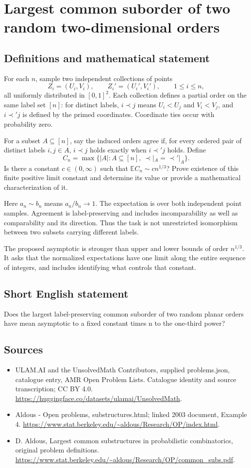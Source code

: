 \documentclass[11pt,a4paper]{article}
\begin{document}
\section*{Largest common suborder of two random two-dimensional orders}\label{statement}

\subsection{Definitions and mathematical statement}
For each $n$, sample two independent collections of points
\[
Z_i=(U_i,V_i),\qquad Z_i'=(U_i',V_i'),\qquad 1\le i\le n,
\]
all uniformly distributed in $[0,1]^2$. Each collection defines a partial order on the same label set $[n]$: for distinct labels, $i\prec j$ means $U_i<U_j$ and $V_i<V_j$, and $i\prec'j$ is defined by the primed coordinates. Coordinate ties occur with probability zero.

For a subset $A\subseteq[n]$, say the induced orders agree if, for every ordered pair of distinct labels $i,j\in A$, $i\prec j$ holds exactly when $i\prec'j$ holds. Define
\[
C_n=\max\{|A|:A\subseteq[n],\ \prec|_A=\prec'|_A\}.
\]
Is there a constant $c\in(0,\infty)$ such that $\mathbb EC_n\sim c n^{1/3}$? Prove existence of this finite positive limit constant and determine its value or provide a mathematical characterization of it.

Here $a_n\sim b_n$ means $a_n/b_n\to1$. The expectation is over both independent point samples. Agreement is label-preserving and includes incomparability as well as comparability and its direction. Thus the task is not unrestricted isomorphism between two subsets carrying different labels.

The proposed asymptotic is stronger than upper and lower bounds of order $n^{1/3}$. It asks that the normalized expectations have one limit along the entire sequence of integers, and includes identifying what controls that constant.
\subsection{Short English statement}
Does the largest label-preserving common suborder of two random planar orders have mean asymptotic to a fixed constant times n to the one-third power?
\subsection{Sources}
\begin{itemize}
\item[S1] ULAM.AI and the UnsolvedMath Contributors, supplied problems.json, catalogue entry, AMR Open Problem Lists. Catalogue identity and source transcription; CC BY 4.0.
\url{https://huggingface.co/datasets/ulamai/UnsolvedMath}.
\item[S2] Aldous - Open problems, substructures.html; linked 2003 document, Example 4. 
\url{https://www.stat.berkeley.edu/~aldous/Research/OP/index.html}.
\item[S3] D. Aldous, Largest common substructures in probabilistic combinatorics, original problem definitions.
\url{https://www.stat.berkeley.edu/~aldous/Research/OP/common_subs.pdf}.
\end{itemize}
\end{document}
